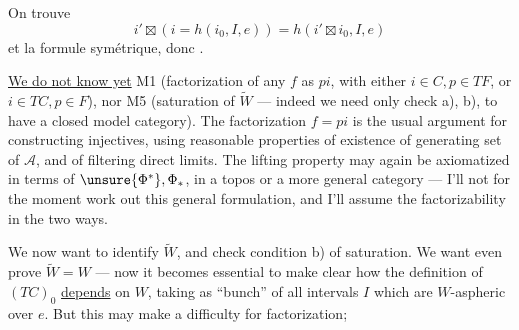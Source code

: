 
On trouve
\[
i'\boxtimes(i=h(i_0,I,e))=h(i'\boxtimes i_0,I,e)
\]
et la formule symétrique, donc .

\uline{We do not know yet} M1 (factorization of any $f$ as $pi$, with either $i\in C,p\in TF$, or $i\in TC,p\in F$), nor M5 (saturation of $\widetilde W$ --- indeed we need only check a), b), to have a closed model category). The factorization $f=pi$ is the usual argument for constructing injectives, using reasonable properties of existence of  generating set of $\mathcal A$, and of filtering direct limits.
The lifting property may again be axiomatized in terms of $\unsure{\Phi^*},\Phi_*$, in a topos or a more general category --- I'll not for the moment work out this general formulation, and  I'll assume the factorizability  in the two ways.

We now want to identify $\widetilde W$, and check condition b) of saturation. We want even prove $\widetilde W=W$ --- now it becomes essential to  make clear how the definition of $(TC)_0$ \uline{depends} on $W$, taking as ``bunch'' of  all intervals $I$ which are $W$-aspheric over $e$. But this may make a difficulty for factorization;

